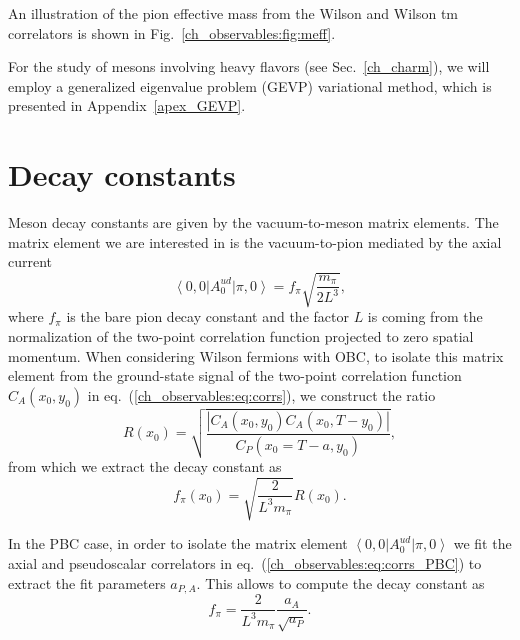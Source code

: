 An illustration of the pion effective mass from the Wilson and Wilson tm correlators is shown in Fig.~\ref{ch_observables:fig:meff}.

For the study of mesons involving heavy flavors (see Sec.~\ref{ch_charm}), we will employ a generalized eigenvalue problem (GEVP) variational method, which is presented in Appendix~\ref{apex_GEVP}.


\section{Decay constants}
\label{ch_observables:sec:dec_const}

Meson decay constants are given by the vacuum-to-meson matrix elements. The matrix element we are interested in is the vacuum-to-pion mediated by the axial current
\begin{equation}
\label{ch_observables:eq:axial_matrix_element}
\left<0,0\right|A_0^{ud}\left|\pi,0\right>=f_{\pi}\sqrt{\frac{m_{\pi}}{2L^3}},
\end{equation}
where $f_{\pi}$ is the bare pion decay constant and the factor $L$ is coming from the normalization of the  two-point correlation function projected to zero spatial momentum. When considering Wilson fermions with OBC, to isolate this matrix element from the ground-state signal  of the two-point correlation function $C_A(x_0 , y_0)$ in eq.~(\ref{ch_observables:eq:corrs}), we construct the ratio
\begin{equation}
\label{ch_observables:eq:R}
R(x_0)=\sqrt{\frac{\left|C_A(x_0,y_0)C_A(x_0,T-y_0)\right|}{C_P(x_0=T-a,y_0)}},
\end{equation}
from which we extract the decay constant as
\begin{equation}
f_{\pi}(x_0)=\sqrt{\frac{2}{L^3m_{\pi}}}R(x_0).
\end{equation}

In the PBC case, in order to isolate the matrix element $\left<0,0\right|A_0^{ud}\left|\pi,0\right>$ we fit the axial and pseudoscalar correlators in eq.~(\ref{ch_observables:eq:corrs_PBC}) to extract the fit parameters $a_{P,A}$. This allows to compute the decay constant as
\begin{equation}
f_{\pi}=\frac{2}{L^3m_{\pi}}\frac{a_A}{\sqrt{a_P}}.
\end{equation}

